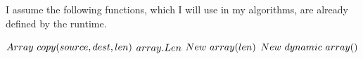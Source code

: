 I assume the following functions, which I will use in my algorithms, are already defined by the runtime.

\begin{algorithm}
	\begin{algorithmic}
		\State $Array\ copy(source, dest, len)$
		\State
		\State $array.Len$
		\State
		\State $New\ array(len)$
		\State
		\State $New\ dynamic\ array()$
	\end{algorithmic}
\end{algorithm}